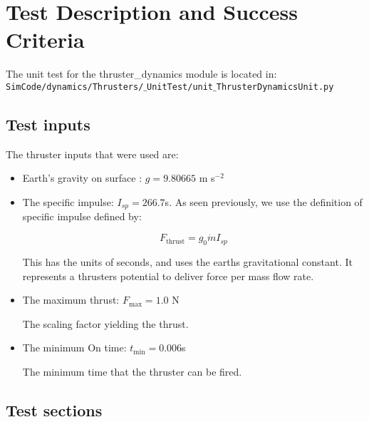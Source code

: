\section{Test Description and Success Criteria}

The unit test for the thruster\_dynamics module is located in:\\

\noindent
{\tt SimCode/dynamics/Thrusters/$\_$UnitTest/unit$\_$ThrusterDynamicsUnit.py} \\

\subsection{Test inputs}

The thruster inputs that were used are:

\begin{itemize}
\item Earth's gravity on surface : $g=9.80665$ m s$^{-2}$ 
\item The specific impulse: $I_{sp} = 266.7$s. As seen previously, we use the definition of specific impulse defined by:

\begin{equation*}
F_{\mathrm{thrust}} = g_0 \dot{m} I_{sp}
\end{equation*}

This has the units of seconds, and uses the earths gravitational constant. It represents a thrusters potential to deliver force per mass flow rate. 
\item The maximum thrust: $F_{\mathrm{max}} = 1.0$ N

The scaling factor yielding the thrust.
\item The minimum On time: $t_{\mathrm{min}} = 0.006$s

The minimum time that the thruster can be fired.
\end{itemize}

\subsection{Test sections}

